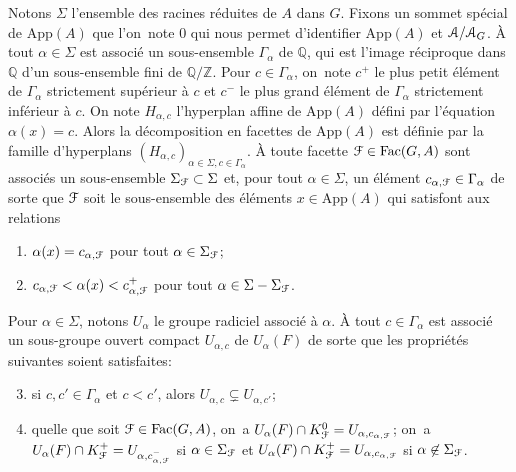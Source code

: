 \documentclass[11pt]{article}
\numberwithin{equation}{section}\providecommand{\og}{«\,}\providecommand{\fg}{\,»}
\let\mathcal \EuScript
\newcommand{\App}{\mathrm{App}}
\newcommand{\Fac}{\mathrm{Fac}}
\newcommand{\cA}{\mathcal{A}}
\newcommand{\cF}{\mathcal{F}}
\newcommand{\ZZ}{\mathbb{Z}}
\newcommand{\QQ}{\mathbb{Q}}
\theoremstyle{plain}
\theoremstyle{definition}
\begin{document}
Notons $\Sigma$ l'ensemble des racines réduites de $A$ dans $G$. Fixons un sommet spécial de $\App(A)$ que l'on~note $0$ qui nous permet d'identifier $\App(A)$ et $\cA/\cA_{G}$. À tout $\alpha\in \Sigma$ est associé un sous-ensemble $\Gamma_{\alpha}$ de $\QQ$, qui est l'image réciproque dans $\QQ$ d'un sous-ensemble fini de $\QQ/\ZZ$. Pour $c\in \Gamma_{\alpha}$, on~note $c^+$ le plus petit élément de $\Gamma_{\alpha}$ strictement supérieur à $c$ et $c^-$ le plus grand élément de $\Gamma_{\alpha}$ strictement inférieur à $c$. On note $H_{\alpha,c}$ l'hyperplan affine de $\App(A)$ défini par l'équation $\alpha(x)=c$. Alors la décomposition en facettes de $\App(A)$ est définie par la famille d'hyperplans $(H_{\alpha,c})_{\alpha\in \Sigma, c\in \Gamma_{\alpha}}$. À toute facette $\cF\in \Fac(G,A)$ sont associés un sous-ensemble $\Sigma_{\cF}\subset \Sigma$ et, pour tout $\alpha\in \Sigma$, un élément $c_{\alpha,\cF}\in \Gamma_{\alpha}$ de sorte que $\cF$ soit le sous-ensemble des éléments $x\in \App(A)$ qui satisfont aux relations
\begin{enumerate}
\item\label{description1}
$\alpha(x)=c_{\alpha,\cF}$ pour tout $\alpha\in \Sigma_{\cF}$;

\item\label{description2}
$c_{\alpha,\cF}<\alpha(x)<c_{\alpha,\cF}^+$ pour tout $\alpha\in \Sigma-\Sigma_{\cF}$.
\end{enumerate}

Pour $\alpha\in \Sigma$, notons $U_{\alpha}$ le groupe radiciel associé à $\alpha$. À tout $c\in \Gamma_{\alpha}$ est associé un sous-groupe ouvert compact $U_{\alpha,c}$ de $U_{\alpha}(F)$ de sorte que les propriétés suivantes soient satisfaites:

\begin{enumerate}\setcounter{enumi}{2}
\item\label{description3}
si $c,c'\in \Gamma_{\alpha}$ et $c<c'$, alors $U_{\alpha,c}\subsetneq U_{\alpha,c'}$;

\item\label{description4}
quelle que soit $\cF\in \Fac(G,A)$, on~a $U_{\alpha}(F)\cap K_{\cF}^0=U_{\alpha,c_{\alpha,\cF}}$; on~a $U_{\alpha}(F)\cap K_{\cF}^+=U_{\alpha,c_{\alpha,\cF}^-}$ si $\alpha\in \Sigma_{\cF}$ et $U_{\alpha}(F)\cap K_{\cF}^+=U_{\alpha,c_{\alpha,\cF}}$ si $\alpha\not \in \Sigma_{\cF}$.
\end{enumerate}
\end{document}

